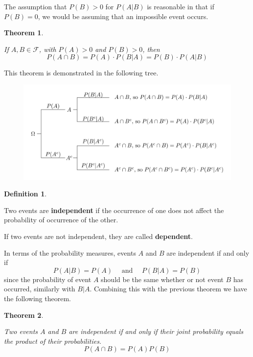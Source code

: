 \documentclass[
]{book}
\newtheorem{theorem}{Theorem}[chapter]
\theoremstyle{definition}
\newtheorem{definition}{Definition}[chapter]
\theoremstyle{definition}
\theoremstyle{definition}
\theoremstyle{definition}
\theoremstyle{remark}
\begin{document}
The assumption that \(P(B)>0\) for \(P(A\vert B)\) is reasonable in that if \(P(B)=0\), we would be assuming that an impossible event occurs.

\begin{theorem}
\protect\hypertarget{thm:probability-intersection}{}\label{thm:probability-intersection}

If \(A,B\in \mathcal{F}\), with \(P(A)>0\) and \(P(B)>0\), then
\[P(A\cap B) = P(A)\cdot P(B\vert A) = P(B) \cdot P(A\vert B)\]

\end{theorem}

This theorem is demonstrated in the following tree.

\begin{figure}

{\centering \includegraphics[width=0.8\linewidth]{tikz/conditional-tree} 

}

\end{figure}

\begin{definition}
\protect\hypertarget{def:unlabeled-div-311}{}\label{def:unlabeled-div-311}

Two events are \textbf{independent} if the occurrence of one does not affect the probability of occurrence of the other.

If two events are not independent, they are called \textbf{dependent}.

\end{definition}

In terms of the probability measures, events \(A\) and \(B\) are independent if and only if
\[P(A|B) = P(A) \quad \mbox{ and } \quad P(B|A) = P(B)\] since the probability of event \(A\) should be the same whether or not event \(B\) has occurred, similarly with \(B|A\). Combining this with the previous theorem we have the following theorem.

\begin{theorem}
\protect\hypertarget{thm:unlabeled-div-312}{}\label{thm:unlabeled-div-312}

Two events \(A\) and \(B\) are independent if and only if their joint probability equals the product of their probabilities.
\[P(A \cap B) = P(A)P(B)\]

\end{theorem}
\end{document}
